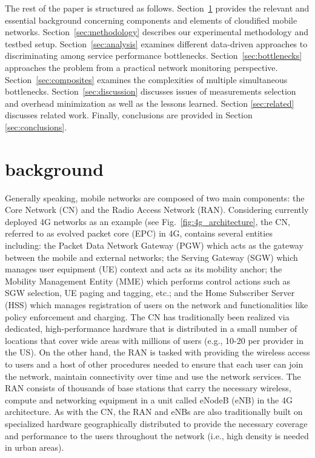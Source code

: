 \documentclass[journal,comsoc]{IEEEtran}
\begin{document}
The rest of the paper is structured as follows. 
Section~\ref{sec:background} provides the relevant and essential background concerning components and elements of cloudified mobile networks. Section~\ref{sec:methodology} describes our experimental methodology and testbed setup. 
Section~\ref{sec:analysis} examines different data-driven approaches to discriminating among service performance bottlenecks. 
Section~\ref{sec:bottlenecks} approaches the problem from a practical network monitoring perspective.  
Section~\ref{sec:composites} examines the complexities of multiple simultaneous bottlenecks.
Section~\ref{sec:discussion} discusses issues of measurements selection and overhead minimization as well as the lessons learned.
Section \ref{sec:related} discusses related work.
Finally, conclusions are provided in Section \ref{sec:conclusions}.


\section{background}
\label{sec:background}

% 
Generally speaking, mobile networks are composed of two main components: the Core Network (CN) and the Radio Access Network (RAN).
Considering currently deployed 4G networks as an example (see Fig.~\ref{fig:4g_architecture}, the CN, referred to as evolved packet core (EPC) in 4G, contains several entities including: the Packet Data Network Gateway (PGW) which acts as the gateway between the mobile and external networks; the Serving Gateway (SGW) which manages user equipment (UE) context and acts as its mobility anchor; the Mobility Management Entity (MME) which performs control actions such as SGW selection, UE paging and tagging, etc.; and the Home Subscriber Server (HSS) which manages registration of users on the network and functionalities like policy enforcement and charging.
The CN has traditionally been realized via dedicated, high-performance hardware that is distributed in a small number of locations that cover wide areas with millions of users (e.g., 10-20 per provider in the US). 
On the other hand, the RAN is tasked with providing the wireless access to users and a host of other procedures needed to ensure that each user can join the network, maintain connectivity over time and use the network services. The RAN consists of thousands of base stations that carry the necessary wireless, compute and networking equipment in a unit called eNodeB (eNB) in the 4G architecture. As with the CN, the RAN and eNBs are also traditionally built on specialized hardware geographically distributed to provide the necessary coverage and performance to the users throughout the network (i.e., high density is needed in urban areas).
\end{document}
